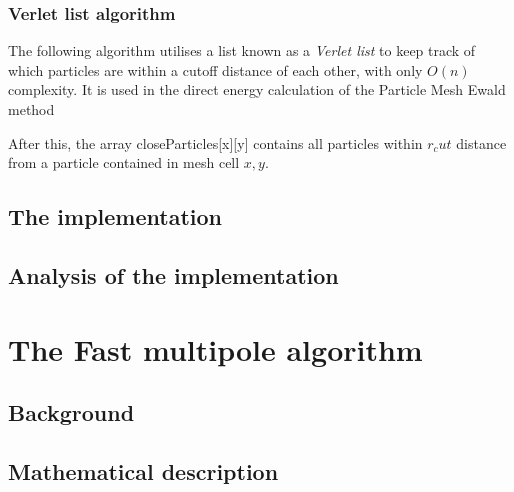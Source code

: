 \documentclass[pdftex,twoside,a4paper]{report}
\newcommand{\pmem}{Particle Mesh Ewald method}
\begin{document}
\subsubsection{Verlet list algorithm}
\label{sec:verlet}
The following algorithm utilises a list known as a \emph{Verlet list} to keep track of which particles are within a cutoff distance of each other, with only $O(n)$ complexity. It is used in the direct energy calculation of the \pmem\\
\begin{algorithm}[H]
\SetLine
{}
\end{algorithm}
After this, the array closeParticles[x][y] contains all particles within $r_cut$ distance from a particle contained in mesh cell $x,y$.
\subsection{The implementation}
\subsection{Analysis of the implementation}

\section{The Fast multipole algorithm}
\subsection{Background}
\subsection{Mathematical description}
\end{document}
